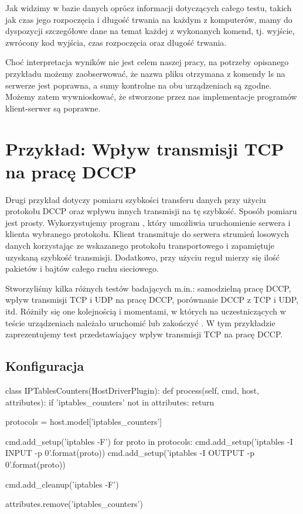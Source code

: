 \documentclass[00-praca-magisterska.tex]{subfiles}
\begin{document}
Jak widzimy w bazie danych oprócz informacji dotyczących całego testu, takich
jak czas jego rozpoczęcia i długość trwania na każdym z komputerów, mamy do
dyspozycji szczegółowe dane na temat każdej z wykonanych komend, tj. wyjście,
zwrócony kod wyjścia, czas rozpoczęcia oraz długość trwania.

Choć interpretacja wyników nie jest celem naszej pracy, na potrzeby opisanego
przykładu możemy zaobserwować, że nazwa pliku otrzymana z komendy ls na serwerze
jest poprawna, a sumy kontrolne na obu urządzeniach są zgodne. Możemy zatem
wywnioskować, że stworzone przez nas implementacje programów klient-serwer są
poprawne.

\section{Przykład: Wpływ transmisji TCP na pracę DCCP}

Drugi przykład dotyczy pomiaru szybkości transferu danych przy użyciu protokołu
DCCP oraz wpływu innych transmisji na tę szybkość. Sposób pomiaru jest prosty.
Wykorzystujemy program , który umożliwia uruchomienie serwera i
klienta wybranego protokołu. Klient transmituje do serwera strumień losowych
danych korzystając ze wskazanego protokołu transportowego i zapamiętuje uzyskaną
szybkość transmisji. Dodatkowo, przy użyciu reguł  mierzy się
ilość pakietów i bajtów całego ruchu sieciowego.

Stworzyliśmy kilka różnych testów badających m.in.: samodzielną pracę DCCP,
wpływ transmisji TCP i UDP na pracę DCCP, porównanie DCCP z TCP i UDP, itd.
Różniły się one kolejnością i momentami, w których na uczestniczących w teście
urządzeniach należało uruchomić lub zakończyć . W tym przykładzie
zaprezentujemy test przedstawiający wpływ transmisji TCP na pracę DCCP. 

\subsection{Konfiguracja}

\begin{pythoncode}
  class IPTablesCounters(HostDriverPlugin):
      def process(self, cmd, host, attributes):
          if 'iptables_counters' not in attributes:
              return 

          protocols = host.model['iptables_counters']

          cmd.add_setup('iptables -F')
          for proto in protocols:
              cmd.add_setup('iptables -I INPUT -p {0}'.format(proto))
              cmd.add_setup('iptables -I OUTPUT -p {0}'.format(proto))

          cmd.add_cleanup('iptables -F')

          attributes.remove('iptables_counters')
\end{pythoncode}
\end{document}
